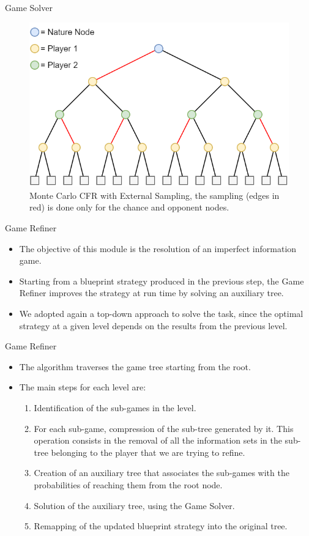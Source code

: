 \documentclass[11pt]{beamer}
\begin{document}
\begin{frame}{Game Solver}
\begin{figure}[hbtp]
		\centering
		\includegraphics[scale=0.3]{images/img_05.png}
		\caption{Monte Carlo CFR with External Sampling, the sampling (edges in red) is done only for the chance and opponent nodes.}
\end{figure}
\end{frame}

\begin{frame}{Game Refiner}
\begin{itemize}
\item The objective of this module is the resolution of an imperfect information game. 
\item Starting from a blueprint strategy produced in the previous step, the Game Refiner improves the strategy at run time by solving an auxiliary tree.
\item We adopted again a top-down approach to solve the task, since the optimal strategy at a given level depends on the results from the previous level.
\end{itemize}
\end{frame}

\begin{frame}{Game Refiner}
\begin{itemize}
\item The algorithm traverses the game tree starting from the root. 
\item The main steps for each level are:
\begin{enumerate}
\item Identification of the sub-games in the level.
\item For each sub-game, compression of the sub-tree generated by it. This operation consists in the removal of all the information sets in the sub-tree belonging to the player that we are trying to refine.
\item Creation of an auxiliary tree that associates the sub-games with the probabilities of reaching them from the root node.
\item Solution of the auxiliary tree, using the Game Solver.
\item Remapping of the updated blueprint strategy into the original tree.
\end{enumerate}
\end{itemize}
\end{frame}
\end{document}
